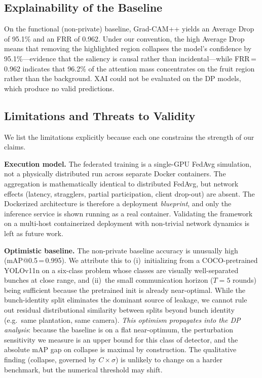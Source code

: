 \documentclass[conference]{IEEEtran}
\begin{document}
\subsection{Explainability of the Baseline}
On the functional (non-private) baseline, Grad-CAM++ yields an Average Drop of
95.1\% and an FRR of 0.962. Under our convention, the high Average Drop means
that removing the highlighted region collapses the model's confidence by
95.1\%---evidence that the saliency is causal rather than incidental---while
FRR\,=\,0.962 indicates that 96.2\% of the attention mass concentrates on the
fruit region rather than the background. XAI could not be evaluated on the DP
models, which produce no valid predictions.

\subsection{Limitations and Threats to Validity}
\label{sec:limitations}
We list the limitations explicitly because each one constrains the strength of
our claims.

\textbf{Execution model.} The federated training is a single-GPU FedAvg
simulation, not a physically distributed run across separate Docker
containers. The aggregation is mathematically identical to distributed
FedAvg, but network effects (latency, stragglers, partial participation,
client drop-out) are absent. The Dockerized architecture is therefore a
deployment \emph{blueprint}, and only the inference service is shown running
as a real container. Validating the framework on a multi-host containerized
deployment with non-trivial network dynamics is left as future work.

\textbf{Optimistic baseline.} The non-private baseline accuracy is unusually
high (mAP@0.5\,=\,0.995). We attribute this to (i)~initializing from a
COCO-pretrained YOLOv11n on a six-class problem whose classes are visually
well-separated bunches at close range, and (ii)~the small communication
horizon ($T{=}5$ rounds) being sufficient because the pretrained init is
already near-optimal. While the bunch-identity split eliminates the dominant
source of leakage, we cannot rule out residual distributional similarity
between splits beyond bunch identity (e.g.\ same plantation, same camera).
\emph{This optimism propagates into the DP analysis}: because the baseline is
on a flat near-optimum, the perturbation sensitivity we measure is an upper
bound for this class of detector, and the absolute mAP gap on collapse is
maximal by construction. The qualitative finding (collapse, governed by
$C\!\times\!\sigma$) is unlikely to change on a harder benchmark, but the
numerical threshold may shift.
\end{document}
